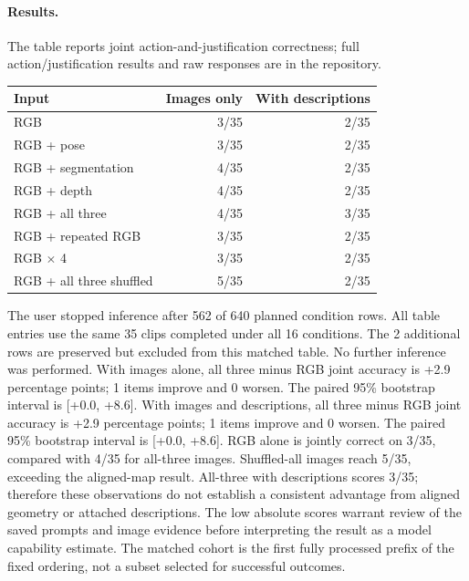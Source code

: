 \paragraph{Results.} The table reports joint action-and-justification correctness; full action/justification results and raw responses are in the repository.
\begin{center}\small\setlength{\tabcolsep}{3pt}
\begin{tabular}{lrr}
Input & Images only & With descriptions \\
\hline
RGB & 3/35 & 2/35 \\
RGB + pose & 3/35 & 2/35 \\
RGB + segmentation & 4/35 & 2/35 \\
RGB + depth & 4/35 & 2/35 \\
RGB + all three & 4/35 & 3/35 \\
RGB + repeated RGB & 3/35 & 2/35 \\
RGB $\times$ 4 & 3/35 & 2/35 \\
RGB + all three shuffled & 5/35 & 2/35 \\
\end{tabular}\end{center}
The user stopped inference after 562 of 640 planned condition rows. All table entries use the same 35 clips completed under all 16 conditions. The 2 additional rows are preserved but excluded from this matched table. No further inference was performed.
With images alone, all three minus RGB joint accuracy is +2.9 percentage points; 1 items improve and 0 worsen. The paired 95\% bootstrap interval is [+0.0, +8.6]. With images and descriptions, all three minus RGB joint accuracy is +2.9 percentage points; 1 items improve and 0 worsen. The paired 95\% bootstrap interval is [+0.0, +8.6]. 
RGB alone is jointly correct on 3/35, compared with 4/35 for all-three images. Shuffled-all images reach 5/35, exceeding the aligned-map result. All-three with descriptions scores 3/35; therefore these observations do not establish a consistent advantage from aligned geometry or attached descriptions. The low absolute scores warrant review of the saved prompts and image evidence before interpreting the result as a model capability estimate. The matched cohort is the first fully processed prefix of the fixed ordering, not a subset selected for successful outcomes.
